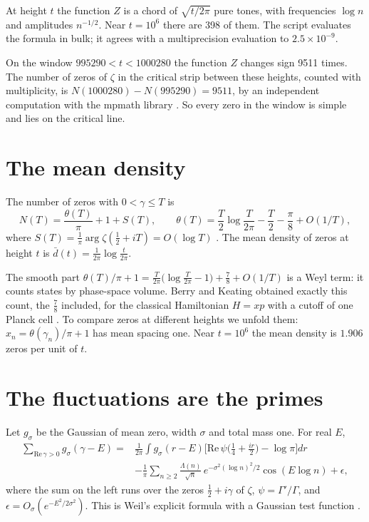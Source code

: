 \documentclass[11pt]{article}
\begin{document}
\physical
At height $t$ the function $Z$ is a chord of $\sqrt{t/2\pi}$ pure tones, with frequencies $\log n$ and amplitudes $n^{-1/2}$.
Near $t = 10^6$ there are 398 of them.
The script  evaluates the formula in bulk; it agrees with a multiprecision evaluation \cite{mpmath} to $2.5\times10^{-9}$.

On the window $995290<t<1000280$ the function $Z$ changes sign 9511 times.
The number of zeros of $\zeta$ in the critical strip between these heights, counted with multiplicity, is $N(1000280)-N(995290) = 9511$, by an independent computation with the mpmath library \cite{mpmath}.
So every zero in the window is simple and lies on the critical line.

\section{The mean density}

\begin{derivation}\label{d:mean}
The number of zeros with $0<\gamma\le T$ is
\[
  N(T) = \frac{\theta(T)}{\pi} + 1 + S(T),\qquad \theta(T) = \frac T2\log\frac{T}{2\pi} - \frac T2 - \frac\pi8 + O(1/T),
\]
where $S(T) = \frac1\pi\arg\zeta(\tfrac12+iT) = O(\log T)$ \cite{Edwards}.
The mean density of zeros at height $t$ is $\bar d(t) = \frac{1}{2\pi}\log\frac{t}{2\pi}$.
\end{derivation}

\physical
The smooth part $\theta(T)/\pi + 1 = \frac{T}{2\pi}\big(\log\frac{T}{2\pi}-1\big) + \frac78 + O(1/T)$ is a Weyl term: it counts states by phase-space volume.
Berry and Keating obtained exactly this count, the $\frac78$ included, for the classical Hamiltonian $H = xp$ with a cutoff of one Planck cell \cite{BerryKeating}.
To compare zeros at different heights we unfold them: $x_n = \theta(\gamma_n)/\pi + 1$ has mean spacing one.
Near $t=10^6$ the mean density is $1.906$ zeros per unit of $t$.

\section{The fluctuations are the primes}

\begin{derivation}\label{d:trace}
Let $g_\sigma$ be the Gaussian of mean zero, width $\sigma$ and total mass one. For real $E$,
\begin{align*}
  \sum_{\mathrm{Re}\,\gamma>0} g_\sigma(\gamma-E) ={}& \frac{1}{2\pi}\int g_\sigma(r-E)\Big[\mathrm{Re}\,\psi\big(\tfrac14+\tfrac{ir}2\big)-\log\pi\Big]dr\\
  &-\frac1\pi\sum_{n\ge2}\frac{\Lambda(n)}{\sqrt n}\,e^{-\sigma^2(\log n)^2/2}\cos(E\log n) + \epsilon,
\end{align*}
where the sum on the left runs over the zeros $\tfrac12+i\gamma$ of $\zeta$, $\psi = \Gamma'/\Gamma$, and $\epsilon = O_\sigma(e^{-E^2/2\sigma^2})$.
This is Weil's explicit formula with a Gaussian test function \cite{IwaniecKowalski}.
\end{derivation}
\end{document}
